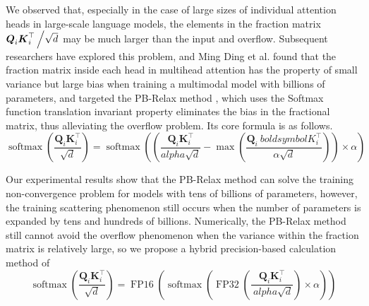 {{We observed that, especially in the case of large sizes of individual attention heads in large-scale language models, the elements in the fraction matrix $\boldsymbol{Q}_i\boldsymbol{K}_i^{\top}\left/\sqrt{d}\right.$ may be much larger than the input and overflow. Subsequent researchers have explored this problem, and Ming Ding et al. found that the fraction matrix inside each head in multihead attention has the property of small variance but large bias when training a multimodal model with billions of parameters, and targeted the PB-Relax method \cite{ding2021cogview}, which uses the Softmax function translation invariant property eliminates the bias in the fractional matrix, thus alleviating the overflow problem. Its core formula is as follows.
\vspace{0.5em}
\begin{equation}
   \operatorname{softmax}\left(\frac{\boldsymbol{Q}_i\boldsymbol{K}_i^{\top}}{\sqrt{d}}\right) =
   \operatorname{softmax}\left(\left(\frac{\boldsymbol{Q}_i\boldsymbol{K}_i^{\top}}{alpha\sqrt{d}} - \max\left(\frac{\boldsymbol{Q}_i\ boldsymbol{K}_i^{\top}}{\alpha\sqrt{d}}\right)\right)\times\alpha\right) 
\end{equation}

Our experimental results show that the PB-Relax method can solve the training non-convergence problem for models with tens of billions of parameters, however, the training scattering phenomenon still occurs when the number of parameters is expanded by tens and hundreds of billions. Numerically, the PB-Relax method still cannot avoid the overflow phenomenon when the variance within the fraction matrix is relatively large, so we propose a hybrid precision-based calculation method of
\vspace{0.5em}
\begin{equation}
   \operatorname{softmax}\left(\frac{\boldsymbol{Q}_i\boldsymbol{K}_i^{\top}}{\sqrt{d}}\right) =
   \operatorname{FP16}\left(\operatorname{softmax}\left(\operatorname{FP32}\left(\frac{\boldsymbol{Q}_i\boldsymbol{K}_i^{\top}}{\ alpha\sqrt{d}}\right)\times\alpha\right)\right)
\end{equation}

}}

